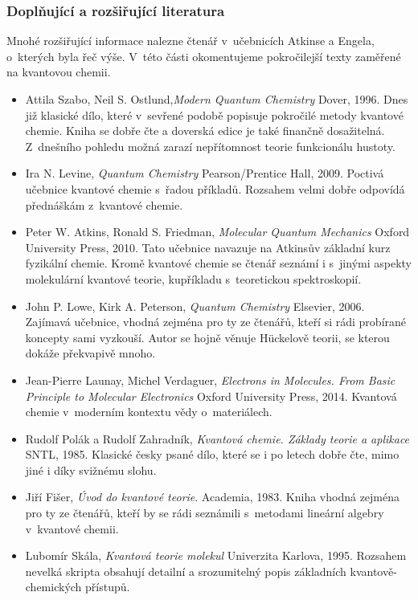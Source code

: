 \subsubsection*{Doplňující a rozšiřující literatura}
Mnohé rozšiřující informace nalezne čtenář v~učebnicích Atkinse a Engela, o~kterých byla řeč výše. V~této části okomentujeme pokročilejší texty zaměřené na kvantovou chemii.
 
\begin{itemize}

\item Attila Szabo, Neil S. Ostlund,\textit{Modern Quantum Chemistry} Dover, 1996. Dnes již klasické dílo, které v~sevřené podobě popisuje pokročilé metody kvantové chemie. Kniha se dobře čte a doverská edice je také finančně dosažitelná. Z~dnešního pohledu možná zarazí nepřítomnost teorie funkcionálu hustoty. 
\item Ira N. Levine, \textit{Quantum Chemistry} Pearson/Prentice Hall, 2009. Poctivá učebnice kvantové chemie s~řadou příkladů. Rozsahem velmi dobře odpovídá přednáškám z~kvantové chemie. 
\item Peter W. Atkins, Ronald S. Friedman, \textit{Molecular Quantum Mechanics} Oxford University Press, 2010. Tato učebnice navazuje na Atkinsův základní kurz fyzikální chemie. Kromě kvantové chemie se čtenář seznámí i s~jinými aspekty molekulární kvantové teorie, kupříkladu s~teoretickou spektroskopií.  
\item John P. Lowe, Kirk A. Peterson, \textit{Quantum Chemistry} Elsevier, 2006. Zajímavá učebnice, vhodná zejména pro ty ze čtenářů, kteří si rádi probírané koncepty sami vyzkouší. Autor se hojně věnuje H\"uckelově teorii, se kterou dokáže překvapivě mnoho.
\item Jean-Pierre Launay, Michel Verdaguer, \textit{Electrons in Molecules. From Basic Principle to Molecular Electronics} Oxford University Press, 2014. Kvantová chemie v~moderním kontextu vědy o~materiálech. 
\item Rudolf Polák a Rudolf Zahradník, \textit{Kvantová chemie. Základy teorie a aplikace} SNTL, 1985. Klasické česky psané dílo, které se i po letech dobře čte, mimo jiné i díky svižnému slohu.
\item Jiří Fišer, \textit{Úvod do kvantové teorie}. Academia, 1983. Kniha vhodná zejména pro ty ze čtenářů, kteří by se rádi seznámili s~metodami lineární algebry v~kvantové chemii.
\item Lubomír Skála, \textit{Kvantová teorie molekul} Univerzita Karlova, 1995. Rozsahem nevelká skripta obsahují detailní a srozumitelný popis základních kvantově-chemických přístupů.

\end{itemize}
